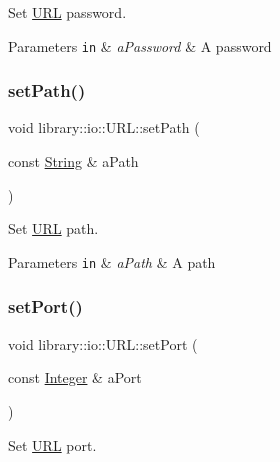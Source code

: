 Set \hyperlink{classlibrary_1_1io_1_1_u_r_l}{U\+RL} password. 


\begin{DoxyParams}[1]{Parameters}
\mbox{\tt in}  & {\em a\+Password} & A password \\
\hline
\end{DoxyParams}
\mbox{\label{classlibrary_1_1io_1_1_u_r_l_ab7f4c0962a64eb3feb5b293c57f7f142}} 
\subsubsection{\texorpdfstring{set\+Path()}{setPath()}}
{\footnotesize\ttfamily void library\+::io\+::\+U\+R\+L\+::set\+Path (\begin{DoxyParamCaption}\item[{const \hyperlink{namespacelibrary_1_1io_a7469b45835a4421045db344d6a5a1f85}{String} \&}]{a\+Path }\end{DoxyParamCaption})}



Set \hyperlink{classlibrary_1_1io_1_1_u_r_l}{U\+RL} path. 


\begin{DoxyParams}[1]{Parameters}
\mbox{\tt in}  & {\em a\+Path} & A path \\
\hline
\end{DoxyParams}
\mbox{\label{classlibrary_1_1io_1_1_u_r_l_ae2be028e95ac8a5d50735e090619fce2}} 
\subsubsection{\texorpdfstring{set\+Port()}{setPort()}}
{\footnotesize\ttfamily void library\+::io\+::\+U\+R\+L\+::set\+Port (\begin{DoxyParamCaption}\item[{const \hyperlink{namespacelibrary_1_1io_a0a929bf9e177597c2e92073d200dda53}{Integer} \&}]{a\+Port }\end{DoxyParamCaption})}



Set \hyperlink{classlibrary_1_1io_1_1_u_r_l}{U\+RL} port. 


